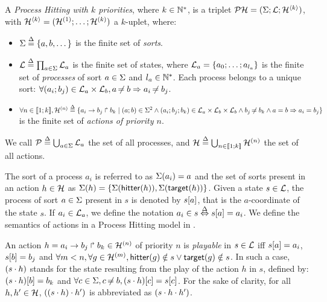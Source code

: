 \begin{definition} 
\label{def:ph}
  A \emph{Process Hitting with $k$ priorities}, where $k \in \mathbb{N}^*$, is a triplet $\mathcal{PH} = (\Sigma; \mathcal{L}; \mathcal{H}^{\langle k \rangle})$, with $\mathcal{H}^{\langle k \rangle} = (\mathcal{H}^{(1)}; \dots; \mathcal{H}^{(k)})$ a $k$-uplet, where:
  \begin{itemize}
    \item $\Sigma \stackrel{\Delta}= \{a,b,\dots\}$ is the finite set of \emph{sorts}.
    \item $\mathcal{L} \stackrel{\Delta}= \prod_{a \in \Sigma} \mathcal{L}_a$ is the finite set of states, where $\mathcal{L}_a = \{a_0 ; \ldots ; a_{l_a}\}$ is the finite set of \emph{processes} of sort $a \in \Sigma$ and $l_a \in \mathbb{N}^*$. Each process belongs to a unique sort: $\forall (a_i; b_j) \in \mathcal{L}_a \times \mathcal{L}_b, a \not\nobreak\mkern -2mu = b \Rightarrow a_i \not\nobreak\mkern -2mu = b_j$.
    \item $\forall n \in \llbracket 1; k \rrbracket, \mathcal{H}^{(n)} \stackrel{\Delta}= \{a_i\rightarrow b_j\Rsh b_k \mid (a; b) \in \Sigma^2 \wedge (a_i; b_j; b_k) \in \mathcal{L}_a \times \mathcal{L}_b \times \mathcal{L}_b \wedge b_j \not\nobreak\mkern -2mu = b_k \wedge a = b \Rightarrow a_i = b_j \}$ is the finite set of \emph{actions of priority $n$}.
  \end{itemize}
  We call $\mathcal{P} \stackrel{\Delta}= \bigcup_{a \in \Sigma} \mathcal{L}_a$ the set of all processes, and $\mathcal{H} \stackrel{\Delta}= \bigcup_{n \in \llbracket 1; k \rrbracket} \mathcal{H}^{(n)}$ the set of all actions.
\end{definition}

\noindent
The sort of a process $a_i$ is referred to as $\Sigma(a_i)=a$ and the set of sorts present in an action $h\in\mathcal{H}$ as $\Sigma(h) = \{\Sigma(\mathsf{hitter}(h)),\Sigma(\mathsf{target}(h))\}$.
Given a state $s\in \mathcal{L}$, the process of sort $a\in\Sigma$ present in $s$ is denoted by ${s[a]}$, that is the $a$-coordinate of the state $s$.
If $a_i\in \mathcal{L}_a$, we define the notation $a_i\in s \stackrel{\Delta}\Leftrightarrow {s[a]}=a_i$.
We define the semantics of actions in a Process Hitting model in .

\begin{definition}
\label{def:play}
  An action $h = a_i\rightarrow b_j\Rsh b_k \in \mathcal{H}^{(n)}$ of priority $n$ is \emph{playable} in $s \in \mathcal{L}$ iff ${s[a]} = a_i$, ${s[b]} = b_j$ and $\forall m < n, \forall g \in \mathcal{H}^{(m)}, \mathsf{hitter}(g) \notin s \vee \mathsf{target}(g) \notin s$.
  In such a case, $(s \cdot h)$ stands for the state resulting from the play of the action $h$ in $s$, defined by: ${(s \cdot h)[b]} = b_k$ and $\forall c\in\Sigma, c\not\nobreak\mkern -2mu = b, {(s\cdot h)[c]} = {s[c]}$.
  For the sake of clarity, for all $h, h'\in\mathcal{H}$, $((s\cdot h)\cdot h')$ is abbreviated as $(s\cdot h\cdot h')$.
\end{definition}

